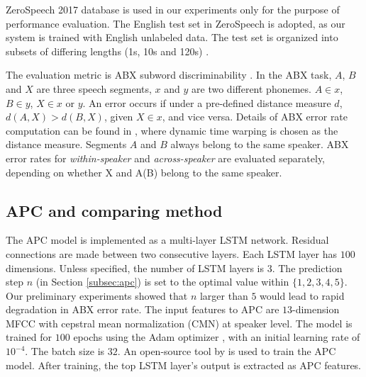 \documentclass[a4paper]{article}
\newcommand{\quotes}[1]{``#1''}
\begin{document}
ZeroSpeech 2017 database is   used in our experiments only for the purpose of performance evaluation. The English test set in ZeroSpeech is adopted, as our system is trained with English unlabeled data. 
The test set is organized into subsets of differing   lengths (1s, 10s and 120s)  \cite{dunbar2017zero}.


The evaluation metric is  ABX subword discriminability \cite{dunbar2017zero}.
In the ABX task, $A$, $B$ and $X$ are three speech segments, $x$ and $y$ are two different phonemes. $A \in x$, $B \in y$, $X \in x$ or $y$. An error occurs if under a pre-defined distance measure $d$, $d(A,X) > d(B,X)$, given $X \in x$, and vice versa.
Details of  ABX error rate computation can be found in \cite{dunbar2017zero}, where dynamic time warping is chosen as the distance measure. Segments $A$ and $B$ always belong to the same speaker. ABX error rates for \textit{within-speaker} and \textit{across-speaker} are evaluated separately, depending
on whether X and A(B) belong to the same speaker.
\subsection{APC and comparing method}
\label{subsec:exp_setup_apc_fhvae}
The APC model is implemented as a  multi-layer  LSTM network. Residual connections are made between two consecutive layers.  
Each LSTM layer has $100$ dimensions.
Unless specified, the number of LSTM layers is $3$.
The prediction step $n$ (in Section \ref{subsec:apc}) is set to  the optimal value within $\{1,2,3,4,5\}$. Our preliminary experiments showed that $n$ larger than $5$ would lead to rapid degradation in ABX error rate. 
The input features to APC are $13$-dimension MFCC with cepstral mean normalization (CMN) at speaker level. 
The model is trained for $100$ epochs using the Adam optimizer \cite{kingma2014adam}, with an initial learning rate of $10^{-4}$. The batch size is  $32$. An open-source tool by \cite{Chung2019} is used to train the APC model. 
After training, the top LSTM layer's output is extracted as APC features.
\end{document}
